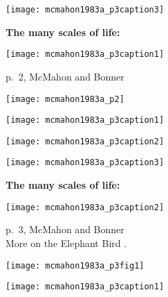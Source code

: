 \begin{marginfigure}[]
  \texttt{[image: mcmahon1983a\_p3caption3]}
\end{marginfigure}

\textbf{The many scales of life:}

\begin{marginfigure}[]
  \texttt{[image: mcmahon1983a\_p3caption1]}\\
\end{marginfigure}

{\small p.\ 2, McMahon and Bonner\cite{mcmahon1983a}}

\begin{marginfigure}[]
  \texttt{[image: mcmahon1983a\_p2]}
\end{marginfigure}

\begin{marginfigure}[]
  \texttt{[image: mcmahon1983a\_p3caption1]}
\end{marginfigure}

\begin{marginfigure}[]
  \texttt{[image: mcmahon1983a\_p3caption2]}
\end{marginfigure}

\begin{marginfigure}[]
  \texttt{[image: mcmahon1983a\_p3caption3]}
\end{marginfigure}

\textbf{The many scales of life:}

\begin{marginfigure}[]
  \texttt{[image: mcmahon1983a\_p3caption2]}\\
\end{marginfigure}

\small p.\ 3, McMahon and Bonner\cite{mcmahon1983a}
\\
\small
More on the Elephant Bird .

\begin{marginfigure}[]
  \texttt{[image: mcmahon1983a\_p3fig1]}
\end{marginfigure}

\begin{marginfigure}[]
  \texttt{[image: mcmahon1983a\_p3caption1]}
\end{marginfigure}


